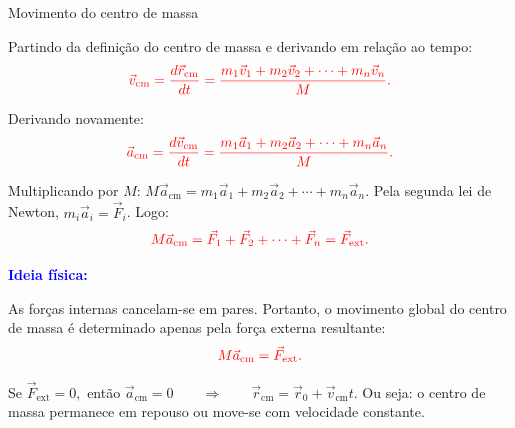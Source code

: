 \documentclass{beamer}
\begin{document}
	
	\begin{frame}{Movimento do centro de massa}
		\scriptsize
		
		Partindo da definição do centro de massa e derivando em relação ao tempo:
		\[
		\textcolor{red}{
			\vec v_{\text{cm}}
			=
			\frac{d\vec r_{\text{cm}}}{dt}
			=
			\frac{m_1\vec v_1+m_2\vec v_2+\cdots+m_n\vec v_n}{M}.}
		\]
		
		Derivando novamente:
		\[
		\textcolor{red}{
			\vec a_{\text{cm}}
			=
			\frac{d\vec v_{\text{cm}}}{dt}
			=
			\frac{m_1\vec a_1+m_2\vec a_2+\cdots+m_n\vec a_n}{M}.}
		\]
		
		Multiplicando por \(M\):
		$
		{
			M\vec a_{\text{cm}}
			=
			m_1\vec a_1+m_2\vec a_2+\cdots+m_n\vec a_n.}
		$
		Pela segunda lei de Newton, \(m_i\vec a_i=\vec F_i\). Logo:
		\[
		\textcolor{red}{
			M\vec a_{\text{cm}}
			=
			\vec F_1+\vec F_2+\cdots+\vec F_n
			=
			\vec F_{\text{ext}}.}
		\]
		
		\textcolor{blue}{\textbf{Ideia física:}}
		
		As forças internas cancelam-se em pares. Portanto, o movimento global do centro de massa é determinado apenas pela força externa resultante:
		\[
		\textcolor{red}{M\vec a_{\text{cm}}=\vec F_{\text{ext}}.}
		\]
		
		Se
		$
		\vec F_{\text{ext}}=0,
		$
		então
		$
		\vec a_{\text{cm}}=0
		\qquad \Rightarrow \qquad
		\vec r_{\text{cm}}=\vec r_0+\vec v_{\text{cm}}t.
		$
		Ou seja: o centro de massa permanece em repouso ou move-se com velocidade constante.
		
	\end{frame}
	
\end{document}
